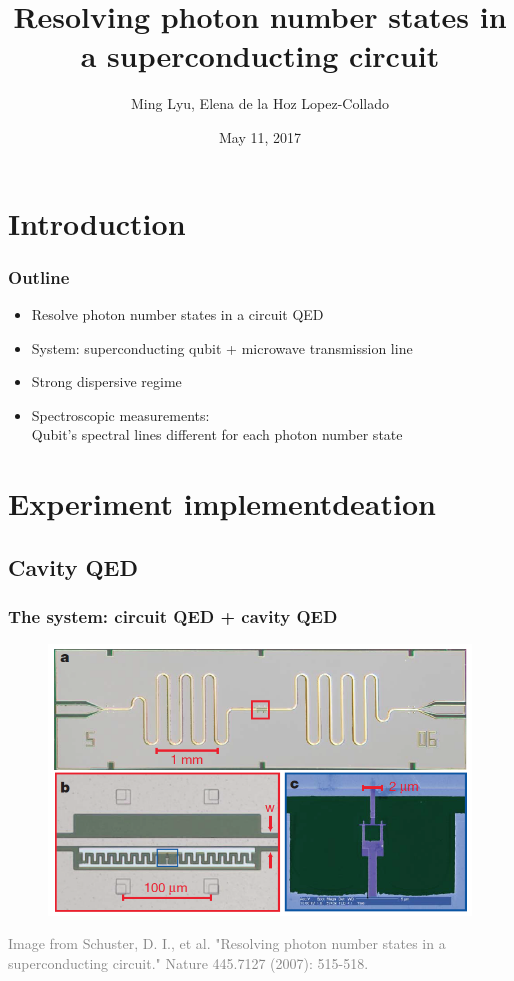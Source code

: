 \documentclass[xcolor=dvipsnames,hyperref={CJKbookmarks=true},aspectratio=169]{beamer}
\title[Nature 445, 515-518]{Resolving photon number states in a superconducting circuit}
\author[Ming, Elena]{Ming Lyu, Elena de la Hoz Lopez-Collado}
\institute[Princeton]{Final projects for ELE456 at Princeton}
\date{May 11, 2017}
\begin{document}
\begin{frame}
\titlepage
\end{frame}
\begin{frame}
    \tableofcontents
\end{frame}

\section{Introduction} 
    


\begin{frame}
\frametitle{Outline}
\begin{itemize}
\item Resolve photon number states in a circuit QED
\vspace{0.3cm}
\item System: superconducting qubit +  microwave transmission line
\vspace{0.3cm}
\item Strong dispersive regime
\vspace{0.3cm}
\item Spectroscopic measurements: \\
Qubit's spectral lines different for each photon number state
\end{itemize}
\end{frame}

\section{Experiment implementdeation}

\subsection{Cavity QED}
\begin{frame}
\frametitle{The system: circuit QED + cavity QED}
\begin{figure}
\centering
\includegraphics[width=0.7\linewidth]{Circuit.png}
\end{figure}
\tiny{\textcolor{gray}{Image from Schuster, D. I., et al. "Resolving photon number states in a superconducting circuit." Nature 445.7127 (2007): 515-518.\cite{schuster2007resolving}}}
\end{frame}
\end{document}
